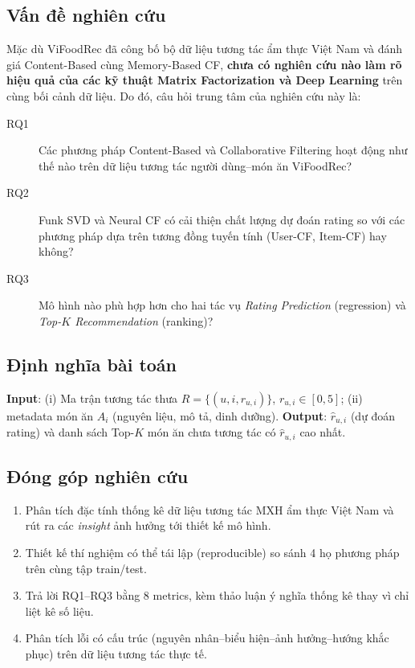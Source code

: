 \documentclass[11pt]{article}
\begin{document}
\subsection{Vấn đề nghiên cứu}
Mặc dù ViFoodRec \cite{tran2024vifoodrec} đã công bố bộ dữ liệu tương tác ẩm thực Việt Nam và đánh giá Content-Based cùng Memory-Based CF, \textbf{chưa có nghiên cứu nào làm rõ hiệu quả của các kỹ thuật Matrix Factorization và Deep Learning} trên cùng bối cảnh dữ liệu. Do đó, câu hỏi trung tâm của nghiên cứu này là:

\begin{description}
    \item[RQ1] Các phương pháp Content-Based và Collaborative Filtering hoạt động như thế nào trên dữ liệu tương tác người dùng--món ăn ViFoodRec?
    \item[RQ2] Funk SVD và Neural CF có cải thiện chất lượng dự đoán rating so với các phương pháp dựa trên tương đồng tuyến tính (User-CF, Item-CF) hay không?
    \item[RQ3] Mô hình nào phù hợp hơn cho hai tác vụ \textit{Rating Prediction} (regression) và \textit{Top-$K$ Recommendation} (ranking)?
\end{description}

\subsection{Định nghĩa bài toán}
\textbf{Input}: (i) Ma trận tương tác thưa $R = \{(u, i, r_{u,i})\}$, $r_{u,i} \in [0,5]$; (ii) metadata món ăn $A_i$ (nguyên liệu, mô tả, dinh dưỡng). \textbf{Output}: $\hat{r}_{u,i}$ (dự đoán rating) và danh sách Top-$K$ món ăn chưa tương tác có $\hat{r}_{u,i}$ cao nhất.

\subsection{Đóng góp nghiên cứu}
\begin{enumerate}
    \item Phân tích đặc tính thống kê dữ liệu tương tác MXH ẩm thực Việt Nam và rút ra các \textit{insight} ảnh hưởng tới thiết kế mô hình.
    \item Thiết kế thí nghiệm có thể tái lập (reproducible) so sánh 4 họ phương pháp trên cùng tập train/test.
    \item Trả lời RQ1--RQ3 bằng 8 metrics, kèm thảo luận ý nghĩa thống kê thay vì chỉ liệt kê số liệu.
    \item Phân tích lỗi có cấu trúc (nguyên nhân--biểu hiện--ảnh hưởng--hướng khắc phục) trên dữ liệu tương tác thực tế.
\end{enumerate}
\end{document}
